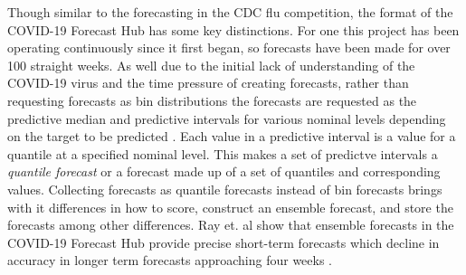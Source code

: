 \documentclass[11pt,notitlepage]{isuthesis}
\begin{document}
Though similar to the forecasting in the CDC flu competition, the format of 
the COVID-19 Forecast Hub has some key distinctions. For one this project has
been operating continuously since it first began, so forecasts have been made
for over 100 straight weeks. 
As well due to the initial lack of understanding of the COVID-19 virus and the 
time 
pressure of
creating forecasts, rather than requesting forecasts as bin distributions
the forecasts are requested as the predictive median and 
predictive intervals for various nominal levels depending on the target to be
predicted \cite[]{bracher2021evaluating}. Each value in a predictive interval
is a value for a quantile at a specified nominal level. This makes a set of 
predictve intervals a \emph{quantile forecast} or a forecast made up of a set
of quantiles and corresponding values.
Collecting forecasts as quantile forecasts instead of bin forecasts brings with 
it differences in how to score, construct an 
ensemble forecast, and store the forecasts among other differences.
Ray et. al show that ensemble forecasts in the COVID-19 Forecast Hub provide
precise short-term forecasts which decline in accuracy in longer term forecasts
approaching four weeks \cite[]{ray2020ensemble}.
\end{document}
